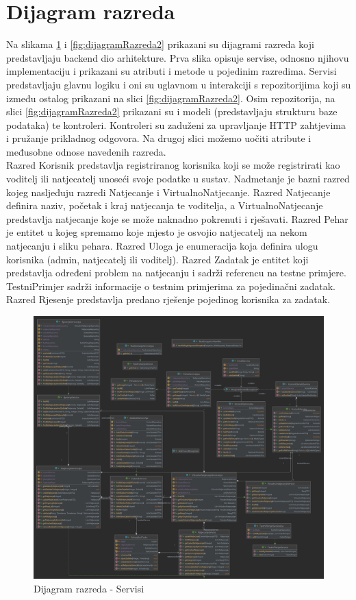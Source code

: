 \eject


\section{Dijagram razreda}

Na slikama \ref{fig:dijagramRazreda1} i \ref{fig:dijagramRazreda2} prikazani su dijagrami razreda koji predstavljaju backend dio arhitekture.
Prva slika opisuje servise, odnosno njihovu implementaciju i prikazani su atributi i metode u pojedinim razredima.
Servisi predstavljaju glavnu logiku i oni su uglavnom u interakciji s repozitorijima koji su između ostalog prikazani na slici \ref{fig:dijagramRazreda2}.
Osim repozitorija, na slici \ref{fig:dijagramRazreda2} prikazani su i modeli (predstavljaju strukturu baze podataka) te kontroleri. 
Kontroleri su zaduženi za upravljanje HTTP zahtjevima i pružanje prikladnog odgovora. Na drugoj slici možemo uočiti atribute i međusobne odnose navedenih razreda. \\

Razred Korisnik predstavlja registriranog korisnika koji se može registrirati kao voditelj ili natjecatelj unoseći svoje podatke u sustav. Nadmetanje je bazni razred kojeg nasljeđuju razredi Natjecanje i VirtualnoNatjecanje.
Razred Natjecanje definira naziv, početak i kraj natjecanja te voditelja, a VirtualnoNatjecanje predstavlja natjecanje koje se može naknadno pokrenuti i rješavati. Razred Pehar je entitet u kojeg spremamo koje mjesto je osvojio natjecatelj na nekom natjecanju i sliku pehara.
Razred Uloga je enumeracija koja definira ulogu korisnika (admin, natjecatelj ili voditelj). Razred Zadatak je entitet koji predstavlja određeni problem na natjecanju i sadrži referencu na testne primjere.
TestniPrimjer sadrži informacije o testnim primjerima za pojedinačni zadatak. Razred Rjesenje predstavlja predano rješenje pojedinog korisnika za zadatak. 

\begin{figure}[H]
	\includegraphics[scale=0.13]{dijagrami/serviceDiagram.png}
	\centering
	\caption{Dijagram razreda - Servisi}
	\label{fig:dijagramRazreda1}
\end{figure}

